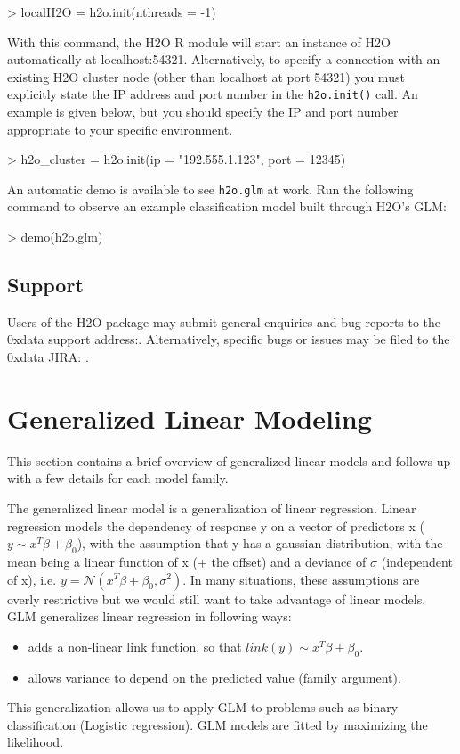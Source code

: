 \documentclass[11pt]{article}
\begin{document}
\begin{spverbatim}
> localH2O = h2o.init(nthreads = -1)

\end{spverbatim}
\noindent
With this command, the H2O R module will start an instance of H2O automatically at localhost:54321. Alternatively,  to specify a connection with an existing H2O cluster node (other than localhost at port 54321) you must explicitly state the IP address and port number in the \texttt{h2o.init()} call. An example is given below, but you should specify the IP and port number appropriate to your specific environment.

\begin{spverbatim}
> h2o_cluster = h2o.init(ip = "192.555.1.123", port = 12345)

\end{spverbatim}
\noindent
An automatic demo is available to see \texttt{h2o.glm} at work. Run the following command to observe an example classification model built through H2O's GLM:

\begin{spverbatim}
> demo(h2o.glm)
\end{spverbatim}

\subsection{Support} 

Users of the H2O package may submit general enquiries and bug reports to the 0xdata support address:. Alternatively, specific bugs or issues may be filed to the 0xdata JIRA: .

\section{Generalized Linear Modeling} 
This section contains a brief overview of generalized linear models and follows up with a few details for each model family.

The generalized linear model is a generalization of linear regression. Linear regression models the dependency of response y on a vector of predictors x ($y \sim x^T \beta + \beta_0$), with the assumption that y has a gaussian distribution, with the mean being a linear function of x (+ the offset) and a deviance of $\sigma$ (independent of x), i.e. $ y = \mathcal{N}(x^T \beta + \beta_0 , \sigma^2) $. In many situations, these assumptions are overly restrictive but we would still want to take advantage of linear models. GLM generalizes linear regression in following ways: 
\begin{itemize} 
\item adds a non-linear link function, so that $link(y) \sim x^T \beta + \beta_0$.
\item allows variance to depend on the predicted value (family argument).

\end{itemize}
This generalization allows us to apply GLM to problems such as binary classification (Logistic regression).
GLM models are fitted by maximizing the likelihood.
\end{document}
